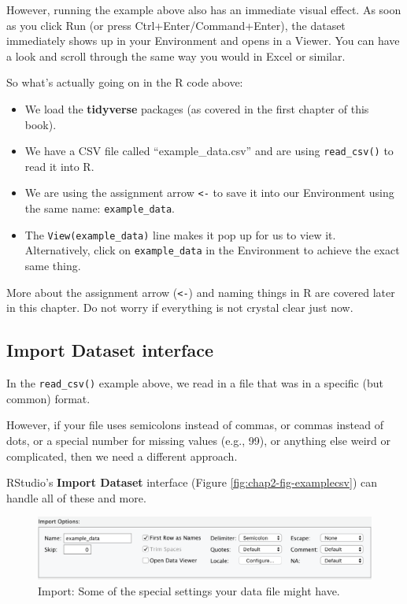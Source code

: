 \documentclass[
  12pt,
  krantz2]{krantz}
\providecommand{\tightlist}{%
  \setlength{\itemsep}{0pt}\setlength{\parskip}{0pt}}
\begin{document}
However, running the example above also has an immediate visual effect.
As soon as you click Run (or press Ctrl+Enter/Command+Enter), the dataset immediately shows up in your Environment and opens in a Viewer.
You can have a look and scroll through the same way you would in Excel or similar.

So what's actually going on in the R code above:

\begin{itemize}
\tightlist
\item
  We load the \textbf{tidyverse} packages (as covered in the first chapter of this book).
\item
  We have a CSV file called ``example\_data.csv'' and are using \texttt{read\_csv()} to read it into R.
\item
  We are using the assignment arrow \texttt{\textless{}-} to save it into our Environment using the same name: \texttt{example\_data}.
\item
  The \texttt{View(example\_data)} line makes it pop up for us to view it. Alternatively, click on \texttt{example\_data} in the Environment to achieve the exact same thing.
\end{itemize}

More about the assignment arrow (\texttt{\textless{}-}) and naming things in R are covered later in this chapter.
Do not worry if everything is not crystal clear just now.

\hypertarget{import-dataset-interface}{%
\subsection{Import Dataset interface}\label{import-dataset-interface}}

In the \texttt{read\_csv()} example above, we read in a file that was in a specific (but common) format.

However, if your file uses semicolons instead of commas, or commas instead of dots, or a special number for missing values (e.g., 99), or anything else weird or complicated, then we need a different approach.

RStudio's \textbf{Import Dataset} interface (Figure \ref{fig:chap2-fig-examplecsv}) can handle all of these and more.

\begin{figure}

{\centering \includegraphics[width=0.7\linewidth]{images/chapter02/import_options} 

}

\caption{Import: Some of the special settings your data file might have.}\label{fig:chap02-fig-import-tool}
\end{figure}
\end{document}
